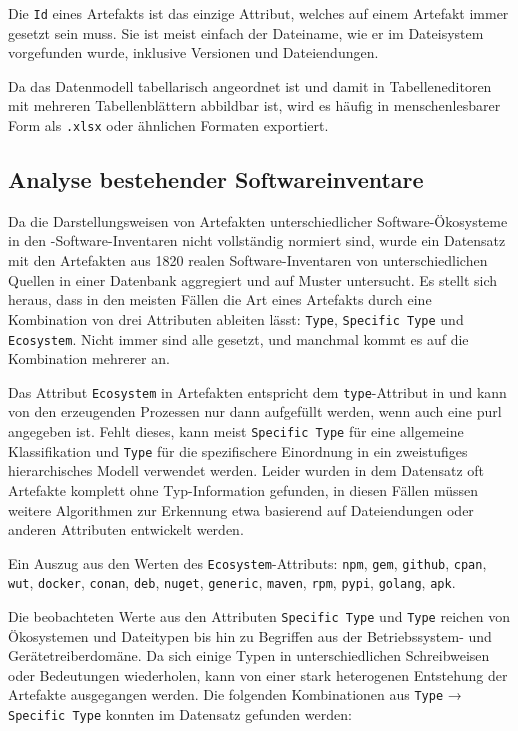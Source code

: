 Die \texttt{Id} eines Artefakts ist das einzige Attribut, welches auf einem Artefakt immer gesetzt sein muss.
Sie ist meist einfach der Dateiname, wie er im Dateisystem vorgefunden wurde, inklusive Versionen und Dateiendungen.

Da das Datenmodell tabellarisch angeordnet ist und damit in Tabelleneditoren mit mehreren Tabellenblättern abbildbar ist, wird es häufig in menschenlesbarer Form als \texttt{.xlsx} oder ähnlichen Formaten exportiert.

\subsection{Analyse bestehender Softwareinventare}\label{subsec:analysis-ae-software-inventories}

Da die Darstellungsweisen von Artefakten unterschiedlicher Software-Ökosysteme in den \metaeffekt-Software-Inventaren nicht vollständig normiert sind, wurde ein Datensatz mit den Artefakten aus 1820 realen Software-Inventaren von unterschiedlichen Quellen in einer Datenbank aggregiert und auf Muster untersucht.
Es stellt sich heraus, dass in den meisten Fällen die Art eines Artefakts durch eine Kombination von drei Attributen ableiten lässt: \texttt{Type}, \texttt{Specific Type} und \texttt{Ecosystem}.
Nicht immer sind alle gesetzt, und manchmal kommt es auf die Kombination mehrerer an.

Das Attribut \texttt{Ecosystem} in Artefakten entspricht dem \texttt{type}-Attribut in  und kann von den erzeugenden Prozessen nur dann aufgefüllt werden, wenn auch eine \acrshort{purl} angegeben ist.
Fehlt dieses, kann meist \texttt{Specific Type} für eine allgemeine Klassifikation und \texttt{Type} für die spezifischere Einordnung in ein zweistufiges hierarchisches Modell verwendet werden.
Leider wurden in dem Datensatz oft Artefakte komplett ohne Typ-Information gefunden, in diesen Fällen müssen weitere Algorithmen zur Erkennung etwa basierend auf Dateiendungen oder anderen Attributen entwickelt werden.

Ein Auszug aus den Werten des \texttt{Ecosystem}-Attributs:
\texttt{npm}, \texttt{gem}, \texttt{github}, \texttt{cpan}, \texttt{wut}, \texttt{docker}, \texttt{conan}, \texttt{deb}, \texttt{nuget}, \texttt{generic}, \texttt{maven}, \texttt{rpm}, \texttt{pypi}, \texttt{golang}, \texttt{apk}.

Die beobachteten Werte aus den Attributen \texttt{Specific Type} und \texttt{Type} reichen von Ökosystemen und Dateitypen bis hin zu Begriffen aus der Betriebssystem- und Gerätetreiberdomäne.
Da sich einige Typen in unterschiedlichen Schreibweisen oder Bedeutungen wiederholen, kann von einer stark heterogenen Entstehung der Artefakte ausgegangen werden.
Die folgenden Kombinationen aus \texttt{Type} → \texttt{Specific Type} konnten im Datensatz gefunden werden:

